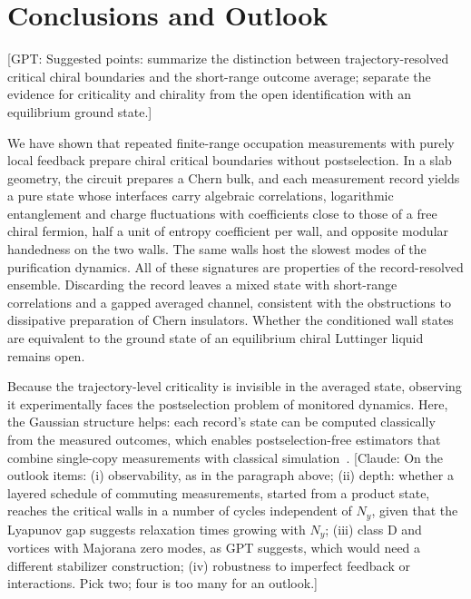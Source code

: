 \documentclass[aps,prb,10pt,twocolumn,superscriptaddress,longbibliography,floatfix]{revtex4-2}
\newcommand{\GPT}[1]{{\color{magenta}[GPT: #1]}}
\newcommand{\claudeadd}[1]{{\color{orange}#1}}
\newcommand{\claudecom}[1]{{\color{ForestGreen}[Claude: #1]}}
\begin{document}
\FloatBarrier
{\color{blue}\section{Conclusions and Outlook}
\label{sec:Conclusions}}

\GPT{Suggested points: summarize the distinction between trajectory-resolved critical chiral boundaries and the short-range outcome average; separate the evidence for criticality and chirality from the open identification with an equilibrium ground state.}

\claudeadd{We have shown that repeated finite-range occupation measurements with purely local feedback prepare chiral critical boundaries without postselection. In a slab geometry, the circuit prepares a Chern bulk, and each measurement record yields a pure state whose interfaces carry algebraic correlations, logarithmic entanglement and charge fluctuations with coefficients close to those of a free chiral fermion, half a unit of entropy coefficient per wall, and opposite modular handedness on the two walls. The same walls host the slowest modes of the purification dynamics. All of these signatures are properties of the record-resolved ensemble. Discarding the record leaves a mixed state with short-range correlations and a gapped averaged channel, consistent with the obstructions to dissipative preparation of Chern insulators. Whether the conditioned wall states are equivalent to the ground state of an equilibrium chiral Luttinger liquid remains open.}

\claudeadd{Because the trajectory-level criticality is invisible in the averaged state, observing it experimentally faces the postselection problem of monitored dynamics. Here, the Gaussian structure helps: each record's state can be computed classically from the measured outcomes, which enables postselection-free estimators that combine single-copy measurements with classical simulation~\cite{GarrattAltman2024,McGinley2024}.}
\claudecom{On the outlook items: (i) observability, as in the paragraph above; (ii) depth: whether a layered schedule of commuting measurements, started from a product state, reaches the critical walls in a number of cycles independent of $N_y$, given that the Lyapunov gap suggests relaxation times growing with $N_y$; (iii) class D and vortices with Majorana zero modes, as GPT suggests, which would need a different stabilizer construction; (iv) robustness to imperfect feedback or interactions. Pick two; four is too many for an outlook.}
\end{document}
